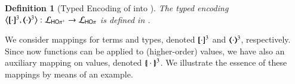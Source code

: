 \documentclass[preprint,11pt]{elsarticle}
\newtheorem{definition}{Definition}[section]
\begin{document}
{{%
%

\begin{definition}
[Typed Encoding of \HOpp into \HOp]
\label{d:enc:hopptohop}
The typed encoding
$\enco{\map{\cdot}^{3}, \mapt{\cdot}^{3}}: \tyl{L}_\HOpp \to \tyl{L}_{\HOp}$ is defined
in .
\end{definition}

We consider mappings for terms and types, denoted $[\!\![\cdot]\!\!]^{3}$ and $(\!\!\langle\cdot\rangle\!\!)^{3}$, respectively.
Since now functions can be applied to (higher-order) values, we have also an auxiliary mapping on values, denoted $\{\!|\cdot|\!\}^3$. 
We illustrate the essence of these mappings by means of an example.

}}
\end{document}
